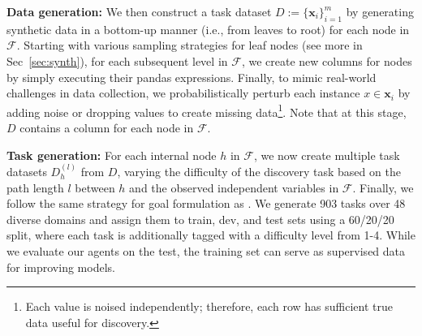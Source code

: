 \textbf{Data generation:} We then construct a task dataset $D:=\{\mathbf{x}_i\}_{i=1}^m$ by generating synthetic data in a bottom-up manner (i.e., from leaves to root) for each node in $\mathcal{F}$. Starting with various sampling strategies for leaf nodes (see more in Sec~\ref{sec:synth}),
for each subsequent level in $\mathcal{F}$, we create new columns for nodes by simply executing their pandas expressions.
Finally, to mimic real-world challenges in data collection, we probabilistically perturb each instance $x \in \mathbf{x}_i$ 
by adding noise or dropping values 
to create missing data\footnote{Each value is noised independently; therefore, each row has sufficient true data useful for discovery.}. 
Note that at this stage, $D$ contains a column for each node in $\mathcal{F}$.

\textbf{Task generation:} For each internal node $h$ in $\mathcal{F}$, we now create multiple task datasets $D_h^{(l)}$ from $D$, varying the difficulty of the discovery task based on the path length $l$ between $h$ and the observed independent variables in $\mathcal{F}$. 
Finally, we follow the same strategy for goal formulation as \real{}.
We generate 903 tasks over 48 diverse domains and assign them to train, dev, and test sets using a 60/20/20 split, where each task is additionally tagged with a difficulty level from 1-4. While we evaluate our agents on the test, the training set can serve as supervised data for improving models. 


